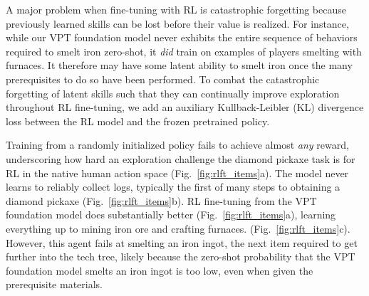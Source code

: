 A major problem when fine-tuning with RL is catastrophic forgetting \cite{kudithipudi2022biological, kirkpatrick2017overcoming} because previously learned skills can be lost before their value is realized.
For instance, while our VPT foundation model never exhibits the entire sequence of behaviors required to smelt iron zero-shot, it \textit{did} train on examples of players smelting with furnaces. It therefore may have some latent ability to smelt iron once the many prerequisites to do so have been performed.
To combat the catastrophic forgetting of latent skills such that they can continually improve exploration throughout RL fine-tuning, we add an auxiliary Kullback-Leibler (KL) divergence loss between the RL model and the frozen pretrained policy.\cite{vinyals2019grandmaster}

Training from a randomly initialized policy fails to achieve almost \emph{any} reward, underscoring how hard an exploration challenge the diamond pickaxe task is for RL in the native human action space (Fig.~\ref{fig:rlft_items}a).
The model never learns to reliably collect logs, typically the first of many steps to obtaining a diamond pickaxe (Fig.~\ref{fig:rlft_items}b).
RL fine-tuning from the VPT foundation model does substantially better (Fig.~\ref{fig:rlft_items}a), learning everything up to mining iron ore and crafting furnaces. (Fig.~\ref{fig:rlft_items}c). However, this agent fails at smelting an iron ingot, the next item required to get further into the tech tree, likely because the zero-shot probability that the VPT foundation model smelts an iron ingot is too low, even when given the prerequisite materials.

